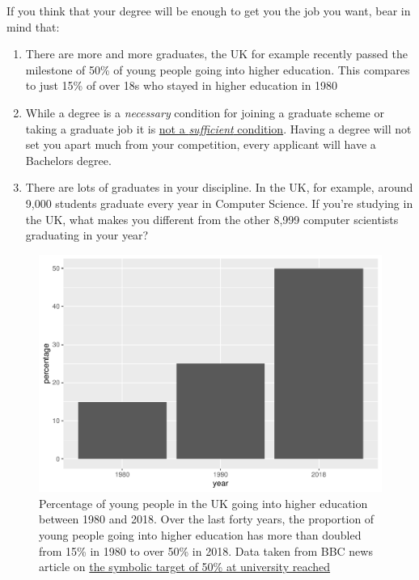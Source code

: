 \documentclass[
]{book}
\providecommand{\tightlist}{%
  \setlength{\itemsep}{0pt}\setlength{\parskip}{0pt}}
\begin{document}
If you think that your degree will be enough to get you the job you want, bear in mind that:

\begin{enumerate}
\def\labelenumi{\arabic{enumi}.}
\tightlist
\item
  There are more and more graduates, the UK for example recently passed the milestone of 50\% of young people going into higher education. This compares to just 15\% of over 18s who stayed in higher education in 1980 \citep{lotsofgrads}
\item
  While a degree is a \emph{necessary} condition for joining a graduate scheme or taking a graduate job it is \href{https://en.wikipedia.org/wiki/Necessity_and_sufficiency}{not a \emph{sufficient} condition}. Having a degree will not set you apart much from your competition, every applicant will have a Bachelors degree.
\item
  There are lots of graduates in your discipline. In the UK, for example, around 9,000 students graduate every year in Computer Science. If you're studying in the UK, what makes you different from the other 8,999 computer scientists graduating in your year?
\end{enumerate}

\begin{figure}

{\centering \includegraphics[width=1\linewidth]{cdyf_files/figure-latex/lotsofgrads-fig-1} 

}

\caption{Percentage of young people in the UK going into higher education between 1980 and 2018. Over the last forty years, the proportion of young people going into higher education has more than doubled from 15\% in 1980 to over 50\% in 2018. Data taken from BBC news article on \href{https://www.bbc.co.uk/news/education-49841620}{the symbolic target of 50\% at university reached} \citep{lotsofgrads}}\label{fig:lotsofgrads-fig}
\end{figure}
\end{document}
